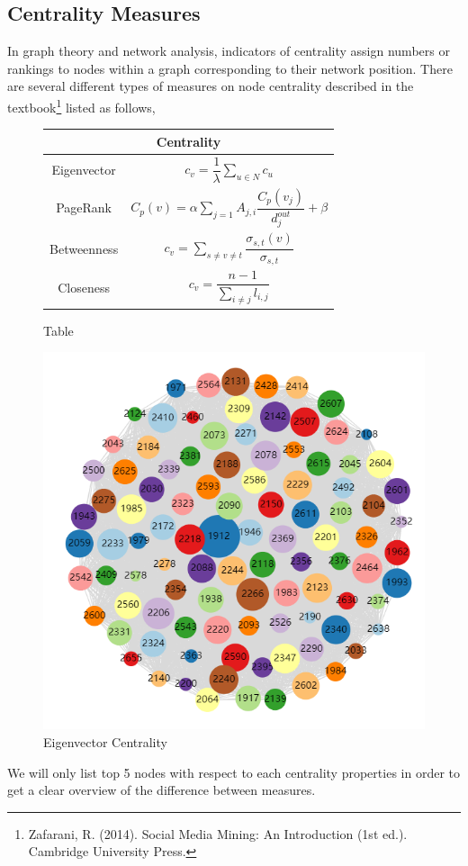 \documentclass[11pt]{article}
\begin{document}
\subsection{Centrality Measures}
In graph theory and network analysis, indicators of centrality assign numbers or rankings to nodes within a graph corresponding to their network position. There are several different types of measures on node centrality described in the textbook\footnote{Zafarani, R. (2014). Social Media Mining: An Introduction (1st ed.). Cambridge University Press.} listed as follows,
\begin{figure}[H]
	\centering
	\parbox{.45\linewidth}{
		\centering
	\begin{tabular}{cc}
		\hline\multicolumn{2}{c}{Centrality}\\\hline
		Eigenvector & $c_v=\dfrac{1}{\lambda}\sum_{u\in N}c_u$\\
		PageRank & $C_p(v)=\alpha\sum_{j=1}A_{j,i}\dfrac{C_p(v_j)}{d_j^{out}}+\beta$\\
		Betweenness & $c_v=\sum_{s\ne v\ne t}\dfrac{\sigma_{s,t}(v)}{\sigma_{s,t}}$\\
		Closeness & $c_v=\dfrac{n-1}{\sum_{i\ne j}l_{i,j}}$	
	\end{tabular}
\caption{Table}
}
	\parbox{.45\linewidth}{
		\centering
	\includegraphics[width=0.5\linewidth]{graphs/eigenvector centrality.PNG}
\caption{Eigenvector Centrality}	
}
\end{figure}
We will only list top 5 nodes with respect to each centrality properties in order to get a clear overview of the difference between measures.
\end{document}
